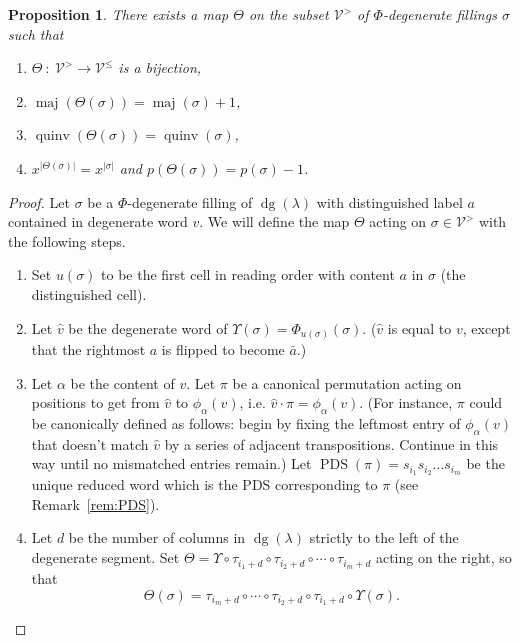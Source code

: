 \documentclass[11pt]{article}
\newtheorem{proposition}[theo]{Proposition}
\theoremstyle{definition}
\numberwithin{equation}{section}
\DeclareMathOperator{\PDS}{PDS}
\DeclareMathOperator{\dg}{dg}
\DeclareMathOperator{\maj}{maj}
\DeclareMathOperator{\quinv}{quinv}
\begin{document}
\begin{proposition}\label{thm:Wbijection}
There exists a map $\Theta$ on the subset $\mathcal{V}^{>}$ of $\Phi$-degenerate fillings $\sigma$ such that
\begin{enumerate}[label=(\arabic*)]
\item \label{it2vvt1}$\Theta\ :\ \mathcal{V}^{>} \longrightarrow \mathcal{V}^{\leq}$ is a bijection,
\item \label{it2vvt2} $\maj(\Theta(\sigma)) = \maj(\sigma) +1$,
\item \label{it2vvt3} $\quinv(\Theta(\sigma))=\quinv(\sigma)$,
\item \label{it2vvt4} $x^{|\Theta(\sigma)|}=x^{|\sigma|}$ and $p(\Theta(\sigma))=p(\sigma)-1$.
\end{enumerate}
\end{proposition}
\begin{proof}
Let $\sigma$ be a $\Phi$-degenerate filling of $\dg(\lambda)$ with distinguished label $a$ contained in degenerate word $v$.  We will define the map $\Theta$ acting on $\sigma\in \mathcal{V}^{>}$ with the following steps.
\begin{enumerate}[label=(\roman*)]
\item\label{item:u} Set $u(\sigma)$ to be the first cell in reading order with content $a$ in $\sigma$ (the distinguished cell). 
\item Let $\widehat{v}$ be the degenerate word of $\Upsilon(\sigma)=\Phi_{u(\sigma)}(\sigma)$. ($\widehat{v}$ is equal to $v$, except that the rightmost $a$ is flipped to become $\bar{a}$.)
\item Let $\alpha$ be the content of $v$. 
Let $\pi$ be a canonical permutation acting on positions to get from $\widehat{v}$ to $\phi_{\alpha}(v)$, i.e. $\widehat{v}\cdot \pi=\phi_\alpha(v)$. (For instance, $\pi$ could be canonically defined as follows: begin by fixing the leftmost entry of $\phi_\alpha(v)$ that doesn't match $\widehat{v}$ by a series of adjacent transpositions. Continue in this way until no mismatched entries remain.) Let $\PDS(\pi)=s_{i_1}s_{i_2}\ldots s_{i_m}$ be the unique reduced word which is the PDS corresponding to $\pi$ (see Remark~\ref{rem:PDS}).
\item Let $d$ be the number of columns in $\dg(\lambda)$ strictly to the left of the degenerate segment. Set 
$\Theta = \Upsilon\circ \tau_{i_1+d}\circ \tau_{i_2+d} \circ\cdots \circ \tau_{i_m+d}$ acting on the right, so that
\[
\Theta(\sigma) = \tau_{i_m+d}\circ \cdots\circ\tau_{i_2+d}\circ \tau_{i_1+d}\circ\Upsilon(\sigma).
\]
\end{enumerate}


\end{proof}
\end{document}

